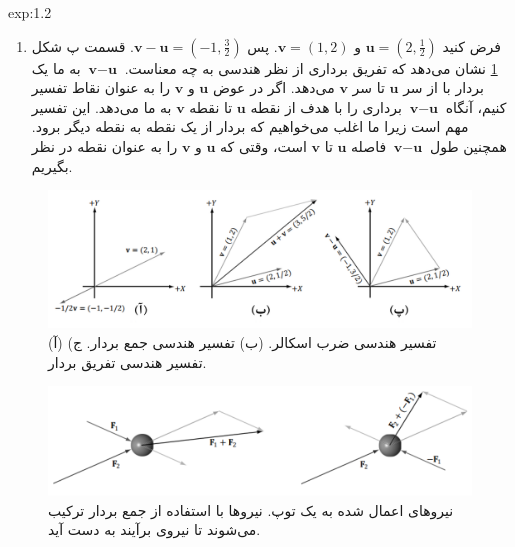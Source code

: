 {\begin{spacing}{1.5}
\begin{example}{exp:1.2}
\begin{enumerate}[label=\textbf{\arabic*}.]
                \item {فرض کنید $\textbf{u}=(2,\frac{\displaystyle 1}{\displaystyle 2})$ و $\textbf{v}=(1,2)$. پس $\textbf{v}-\textbf{u}=(-1,\frac{\displaystyle 3}{\displaystyle 2})$.
                قسمت پ شکل \ref{fig:4.Session.1.1.6} نشان می‌دهد که تفریق برداری از نظر هندسی به چه معناست.
                    $\textbf{v}-\textbf{u}$ به ما یک بردار با از سر $\textbf{u}$ تا سر $\textbf{v}$ می‌دهد.
                    اگر در عوض $\textbf{u}$ و $\textbf{v}$ را به عنوان نقاط تفسیر کنیم، آنگاه $\textbf{v}-\textbf{u}$ برداری را با هدف از نقطه $\textbf{u}$ تا نقطه $\textbf{v}$ به ما می‌دهد.
                    این تفسیر مهم است زیرا ما اغلب می‌خواهیم که بردار از یک نقطه به نقطه دیگر برود.
                    همچنین طول $\textbf{v}-\textbf{u}$ فاصله $\textbf{u}$ تا $\textbf{v}$ است، وقتی که $\textbf{u}$ و $\textbf{v}$ را به عنوان نقطه در نظر بگیریم.}
            \end{enumerate}

            \begin{figure}[H]
                \centering
                \setlength{\belowcaptionskip}{-10pt}
                \includegraphics[width=\textwidth]{Images/4/1/4.Session.1.1.6}
                \caption{(آ) تفسیر هندسی ضرب اسکالر. (ب) تفسیر هندسی جمع بردار. ج) تفسیر هندسی تفریق بردار.}
                \label{fig:4.Session.1.1.6}
            \end{figure}

            \begin{figure}[H]
                \centering
                \setlength{\belowcaptionskip}{-10pt}
                \includegraphics[width=\textwidth]{Images/4/1/4.Session.1.1.7}
                \caption{نیروهای اعمال شده به یک توپ. نیروها با استفاده از جمع بردار ترکیب می‌شوند تا نیروی برآیند به دست آید. \textbf{\vspace{10pt}}}
                \label{fig:4.Session.1.1.7}
            \end{figure}
        \end{example}
    \end{spacing}
}


